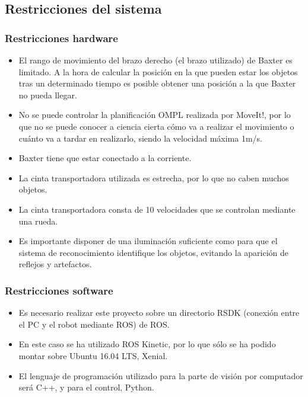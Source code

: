 \subsection{Restricciones del sistema}

\subsubsection{Restricciones hardware}

\begin{itemize}
	\item El rango de movimiento del brazo derecho (el brazo utilizado) de Baxter es limitado. A la hora de calcular la posición en la que pueden estar los objetos tras un determinado tiempo es posible obtener una posición a la que Baxter no pueda llegar.
	\item No se puede controlar la planificación OMPL realizada por MoveIt!, por lo que no se puede conocer a ciencia cierta cómo va a realizar el movimiento o cuánto va a tardar en realizarlo, siendo la velocidad máxima 1m/s.
	\item Baxter tiene que estar conectado a la corriente.
	\item La cinta transportadora utilizada es estrecha, por lo que no caben muchos objetos.
	\item La cinta transportadora consta de 10 velocidades que se controlan mediante una rueda. 
	\item Es importante disponer de una iluminación suficiente como para que el sistema de reconocimiento identifique los objetos, evitando la aparición de reflejos y artefactos. \\
\end{itemize}

\subsubsection{Restricciones software}
\begin{itemize}
	\item Es necesario realizar este proyecto sobre un directorio RSDK (conexión entre el PC y el robot mediante ROS) de ROS.
	\item En este caso se ha utilizado ROS Kinetic, por lo que sólo se ha podido montar sobre Ubuntu 16.04 LTS, Xenial.
	\item El lenguaje de programación utilizado para la parte de visión por computador será C++, y para el control, Python. \\
\end{itemize}

